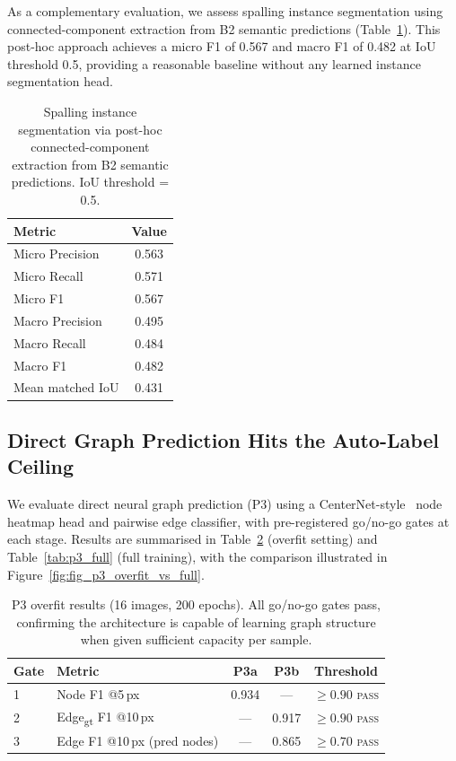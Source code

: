 \documentclass[preprint,12pt]{elsarticle}
\begin{document}
As a complementary evaluation, we assess spalling instance segmentation using connected-component extraction from B2 semantic predictions (Table~\ref{tab:spalling_instance}). This post-hoc approach achieves a micro F1 of 0.567 and macro F1 of 0.482 at IoU threshold 0.5, providing a reasonable baseline without any learned instance segmentation head.

\begin{table}[t]
\centering
\caption{Spalling instance segmentation via post-hoc connected-component extraction from B2 semantic predictions. IoU threshold = 0.5.}
\label{tab:spalling_instance}
\begin{tabular}{lc}
\toprule
Metric & Value \\
\midrule
Micro Precision & 0.563 \\
Micro Recall & 0.571 \\
Micro F1 & 0.567 \\
Macro Precision & 0.495 \\
Macro Recall & 0.484 \\
Macro F1 & 0.482 \\
Mean matched IoU & 0.431 \\
\bottomrule
\end{tabular}
\end{table}


\subsection{Direct Graph Prediction Hits the Auto-Label Ceiling}
\label{sec:results_p3}

We evaluate direct neural graph prediction (P3) using a CenterNet-style~\cite{zhou2019centernet} node heatmap head and pairwise edge classifier, with pre-registered go/no-go gates at each stage. Results are summarised in Table~\ref{tab:p3_overfit} (overfit setting) and Table~\ref{tab:p3_full} (full training), with the comparison illustrated in Figure~\ref{fig:fig_p3_overfit_vs_full}.

\begin{table}[t]
\centering
\caption{P3 overfit results (16 images, 200 epochs). All go/no-go gates pass, confirming the architecture is capable of learning graph structure when given sufficient capacity per sample.}
\label{tab:p3_overfit}
\begin{tabular}{llccc}
\toprule
Gate & Metric & P3a & P3b & Threshold \\
\midrule
1 & Node F1 @5\,px & 0.934 & --- & $\geq 0.90$ \textsc{pass} \\
2 & Edge\textsubscript{gt} F1 @10\,px & --- & 0.917 & $\geq 0.90$ \textsc{pass} \\
3 & Edge F1 @10\,px (pred nodes) & --- & 0.865 & $\geq 0.70$ \textsc{pass} \\
\bottomrule
\end{tabular}
\end{table}
\end{document}

